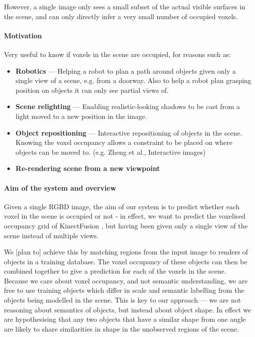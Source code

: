 \documentclass[10pt,a4paper, twocolumn]{article}
\makeatletter
\newcommand*{\eg}{e.g.\@\xspace}
\newcommand*{\ea}{et al.\@\xspace}
\makeatother
\begin{document}
However, a single image only sees a small subset of the actual visible surfaces in the scene, and can only directly infer a very small number of occupied voxels.


\paragraph{Motivation}
Very useful to know if voxels in the scene are occupied, for reasons such as:

\begin{itemize}

\item \textbf{Robotics} --- Helping a robot to plan a path around objects given only a single view of a scene, e.g. from a doorway. Also to help a robot plan grasping position on objects it can only see partial views of.

\item \textbf{Scene relighting} --- Enabling realistic-looking shadows to be cast from a light moved to a new position in the image.

\item \textbf{Object repositioning} --- Interactive repositioning of objects in the scene. Knowing the voxel occupancy allows a constraint to be placed on where objects can be moved to. (\eg Zheng \ea, Interactive images)

\item \textbf{Re-rendering scene from a new viewpoint}
\end{itemize}

\paragraph{Aim of the system and overview}
Given a single RGBD image, the aim of our system is to predict whether each voxel in the scene is occupied or not - in effect, we want to predict the voxelised occupancy grid of KinectFusion \cite{izadi-uist-2011}, but having been given only a single view of the scene instead of multiple views.

We [plan to] achieve this by matching regions from the input image to renders of objects in a training database.
The voxel occupancy of these objects can then be combined together to give a prediction for each of the voxels in the scene. 
Because we care about voxel occupancy, and not semantic understanding, we are free to use training objects which differ in scale and semantic labelling from the objects being modelled in the scene. 
This is key to our approach --- we are not reasoning about semantics of objects, but instead about object shape.
In effect we are hypothesising that any two objects that have a similar shape from one angle are likely to share similarities in shape in the unobserved regions of the scene.
\end{document}

